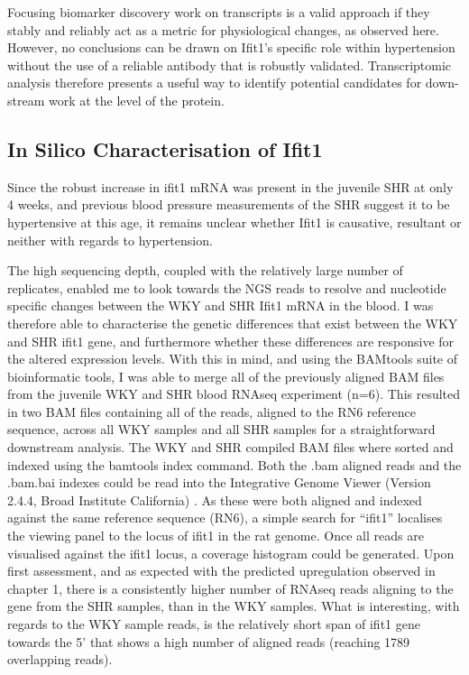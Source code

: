 Focusing biomarker discovery work on transcripts is a valid approach if they stably and reliably act as a metric for physiological changes, as observed here. However, no conclusions can be drawn on Ifit1's specific role within hypertension without the use of a reliable antibody that is robustly validated. Transcriptomic analysis therefore presents a useful way to identify potential candidates for down-stream work at the level of the protein. 


\subsection{In Silico Characterisation of Ifit1}
Since the robust increase in ifit1 mRNA was present in the juvenile SHR at only 4 weeks, and previous blood pressure measurements of the SHR suggest it to be hypertensive at this age, it remains unclear whether Ifit1 is causative, resultant or neither with regards to hypertension. 

The high sequencing depth, coupled with the relatively large number of replicates, enabled me to look towards the NGS reads to resolve and nucleotide specific changes between the WKY and SHR Ifit1 mRNA in the blood. I was therefore able to characterise the genetic differences that exist between the WKY and SHR ifit1 gene, and furthermore whether these differences are responsive for the altered expression levels. With this in mind, and using the BAMtools suite of bioinformatic tools, I was able to merge all of the previously aligned BAM files from the juvenile WKY and SHR blood RNAseq experiment (n=6). This resulted in two BAM files containing all of the reads, aligned to the RN6 reference sequence, across all WKY samples and all SHR samples for a straightforward downstream analysis. The WKY and SHR compiled BAM files where sorted and indexed using the bamtools index command. Both the .bam aligned reads and the .bam.bai indexes could be read into the Integrative Genome Viewer (Version 2.4.4, Broad Institute California) \cite{Thorvaldsdottir2013, Glenn2011}. As these were both aligned and indexed against the same reference sequence (RN6), a simple search for “ifit1” localises the viewing panel to the locus of ifit1 in the rat genome. Once all reads are visualised against the ifit1 locus, a coverage histogram could be generated. Upon first assessment, and as expected with the predicted upregulation observed in chapter 1, there is a consistently higher number of RNAseq reads aligning to the gene from the SHR samples, than in the WKY samples. What is interesting, with regards to the WKY sample reads, is the relatively short span of ifit1 gene towards the 5’ that shows a high number of aligned reads  (reaching 1789 overlapping reads). 

